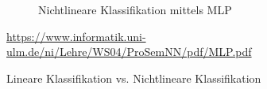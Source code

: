 \begin{figure}[h]
\begin{subfigure}[b]{0.3\textwidth}
		\caption{Nichtlineare Klassifikation mittels MLP}
		\label{non-linear-classification}
	\end{subfigure}
	\caption{Lineare Klassifikation \acs{vs.} Nichtlineare Klassifikation}
	\quelle\url{https://www.informatik.uni-ulm.de/ni/Lehre/WS04/ProSemNN/pdf/MLP.pdf}
\end{figure}





